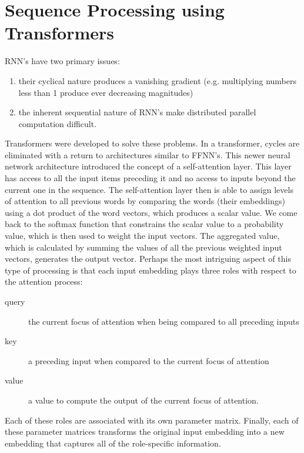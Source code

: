 \documentclass[12pt]{report}
\begin{document}
\section{Sequence Processing using Transformers}
RNN's have two primary issues:
\begin{enumerate}
  \item their cyclical nature produces a vanishing gradient (e.g. multiplying
  numbers less than 1 produce ever decreasing magnitudes)
  \item the inherent sequential nature of RNN's make distributed parallel
  computation difficult.
\end{enumerate}
Transformers were developed to solve these problems.  In a transformer, cycles
are eliminated with a return to architectures similar to FFNN's.  This newer
neural network architecture introduced the concept of a self-attention layer.
This layer has access to all the input items preceding it and no access to
inputs beyond the current one in the sequence.  The self-attention layer then is
able to assign levels of attention to all previous words by comparing the words
(their embeddings) using a dot product of the word vectors, which produces a
scalar value.  We come back to the softmax function that constrains the scalar
value to a probability value, which is then used to weight the input vectors.
The aggregated value, which is calculated by summing the values of all the
previous weighted input vectors, generates the output vector.  Perhaps the most
intriguing aspect of this type of processing is that each input embedding plays
three roles with respect to the attention process:
\begin{description}
  \item[query] the current focus of attention when being compared to all
  preceding inputs
  \item[key] a preceding input when compared to the current focus
  of attention
  \item[value] a value to compute the output of the current focus of attention.
\end{description}
Each of these roles are associated with its own parameter matrix.  Finally, each
of these parameter matrices transforms the original input embedding into a new
embedding that captures all of the role-specific information.
\end{document}
